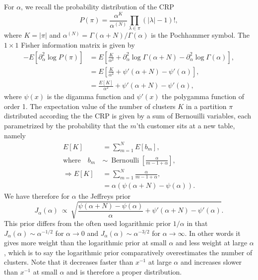 \documentclass[11pt, oneside]{article}   	%
\begin{document}
For $\alpha$, we recall the probability distribution of the CRP
$$P(\pi) = \frac{\alpha^K}{\alpha^{(N)}}\prod_{\lambda\in\pi}(\vert\lambda\vert - 1)!,$$
where $K = \vert\pi\vert$ and $\alpha^{(N)} = \Gamma(\alpha + N)/\Gamma(\alpha)$ is the Pochhammer symbol.
The $1\times 1$ Fisher information matrix is given by
\begin{equation}\begin{split}
-E[\partial^2_\alpha \log P(\pi)] &= E\left[\frac{K}{\alpha^2} + \partial^2_\alpha \log\Gamma(\alpha + N) - \partial^2_\alpha\log\Gamma(\alpha)\right],\\
&= E\left[\frac{K}{\alpha^2} + \psi'(\alpha + N) - \psi'(\alpha)\right],\\
&= \frac{E[K]}{\alpha^2} + \psi'(\alpha + N) - \psi'(\alpha),
\end{split}\end{equation}
where $\psi(x)$ is the digamma function and $\psi'(x)$ the polygamma function of order 1. The expectation value of the number of clusters $K$ in a partition $\pi$ distributed according the the CRP is given by a sum of Bernouilli variables, each parametrized by the probability that the $m$'th customer sits at a new table, namely
\begin{equation}\begin{split}
E[K] &= \sum_{m = 1}^N E[b_m],\\
\text{where}\quad b_m~&\sim~\operatorname{Bernoulli}\left[\frac{\alpha}{m - 1 + \alpha}\right],\\
\Rightarrow E[K] &=  \sum_{m=1}^N \frac{\alpha}{m - 1 + \alpha},\\
&= \alpha(\psi(\alpha + N) - \psi(\alpha)).
\end{split}\end{equation}
We have therefore for $\alpha$ the Jeffreys prior
\begin{equation}
J_\alpha(\alpha)~\propto~\sqrt{\frac{\psi(\alpha + N) - \psi(\alpha)}{\alpha} + \psi'(\alpha +N) - \psi'(\alpha)}.
\label{eq:jeffalpha}
\end{equation}
This prior differs from the often used logarithmic prior $1/\alpha$ in that $J_{\alpha}(\alpha) \sim \alpha^{-1/2}$ for $\alpha\rightarrow 0$ and $J_{\alpha}(\alpha) \sim\alpha^{-3/2}$ for $\alpha\rightarrow\infty$. In other words it gives more weight than the logarithmic prior at small $\alpha$ and less weight at large $\alpha$, which is to say the logarithmic prior comparatively overestimates the number of clusters. Note that it decreases faster than $x^{-1}$ at large $\alpha$ and increases slower than $x^{-1}$ at small $\alpha$ and is therefore a proper distribution.
\end{document}
